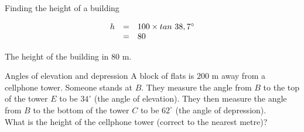 \begin{wex}{Finding the height of a building}
{\begin{equation*}
\begin{array}{ccl}

\hfill h& =& 100\times tan~38,7^{\circ }\hfill \\
& =& 80\hfill
  \end{array}
\end{equation*}

The height of the building in $80$ m.
}
\end{wex}


\begin{wex}{Angles of elevation and depression}
{A block of flats is $200$ m away from a cellphone tower. Someone stands at $B$. They measure the angle from $B$ to the top of the tower $E$ to be $34^{\circ}$ (the angle of elevation). They then measure the angle from $B$ to the bottom of the tower $C$ to be $62^{\circ}$ (the angle of depression).
\\What is the height of the cellphone tower (correct to the nearest metre)?\\

}
\end{wex}
